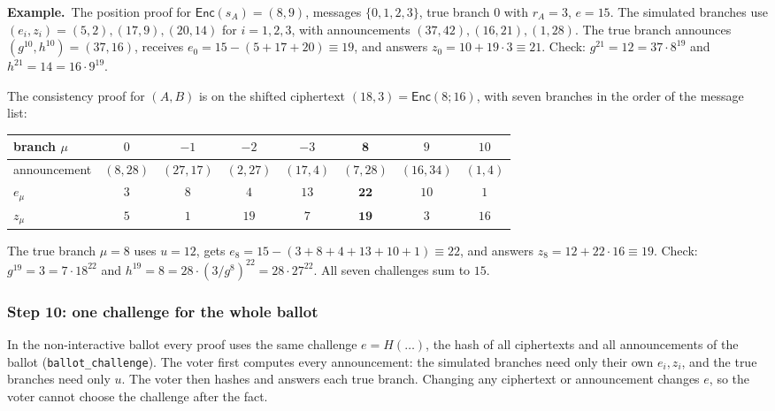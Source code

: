 \documentclass[11pt,a4paper]{article}
\newcommand{\Enc}{\mathsf{Enc}}
\newcommand{\rocq}[1]{\texttt{#1}}
\newcommand{\ex}[1]{\par\medskip\noindent\textbf{Example.}~#1\par\medskip}
\theoremstyle{remark}
\begin{document}
\ex{The position proof for $\Enc(s_A) = (8, 9)$, messages $\{0, 1, 2,
3\}$, true branch $0$ with $r_A = 3$, $e = 15$. The simulated branches use
$(e_i, z_i) = (5, 2), (17, 9), (20, 14)$ for $i = 1, 2, 3$, with
announcements $(37, 42), (16, 21), (1, 28)$. The true branch announces
$(g^{10}, h^{10}) = (37, 16)$, receives $e_0 = 15 - (5 + 17 + 20) \equiv
19$, and answers $z_0 = 10 + 19 \cdot 3 \equiv 21$. Check: $g^{21} = 12 =
37 \cdot 8^{19}$ and $h^{21} = 14 = 16 \cdot 9^{19}$.

The consistency proof for $(A, B)$ is on the shifted ciphertext $(18, 3) =
\Enc(8; 16)$, with seven branches in the order of the message list:
\begin{center}
\begin{tabular}{@{}lccccccc@{}}
\toprule
branch $\mu$ & $0$ & $-1$ & $-2$ & $-3$ & $\mathbf{8}$ & $9$ & $10$ \\
\midrule
announcement & $(8,28)$ & $(27,17)$ & $(2,27)$ & $(17,4)$ & $(7,28)$ & $(16,34)$ & $(1,4)$ \\
$e_\mu$ & $3$ & $8$ & $4$ & $13$ & $\mathbf{22}$ & $10$ & $1$ \\
$z_\mu$ & $5$ & $1$ & $19$ & $7$ & $\mathbf{19}$ & $3$ & $16$ \\
\bottomrule
\end{tabular}
\end{center}
The true branch $\mu = 8$ uses $u = 12$, gets $e_8 = 15 - (3 + 8 + 4 + 13
+ 10 + 1) \equiv 22$, and answers $z_8 = 12 + 22 \cdot 16 \equiv 19$.
Check: $g^{19} = 3 = 7 \cdot 18^{22}$ and $h^{19} = 8 = 28 \cdot (3 /
g^{8})^{22} = 28 \cdot 27^{22}$. All seven challenges sum to $15$.}

\subsubsection*{Step 10: one challenge for the whole ballot}
In the non-interactive ballot every proof uses the same challenge $e = H(\ldots)$, the
hash of all ciphertexts and all announcements of the ballot
(\rocq{ballot\_challenge}). The voter first computes every announcement:
the simulated branches need only their own $e_i, z_i$, and the true
branches need only $u$. The voter then hashes and answers each true
branch. Changing any ciphertext or announcement changes $e$, so the voter
cannot choose the challenge after the fact.
\end{document}
